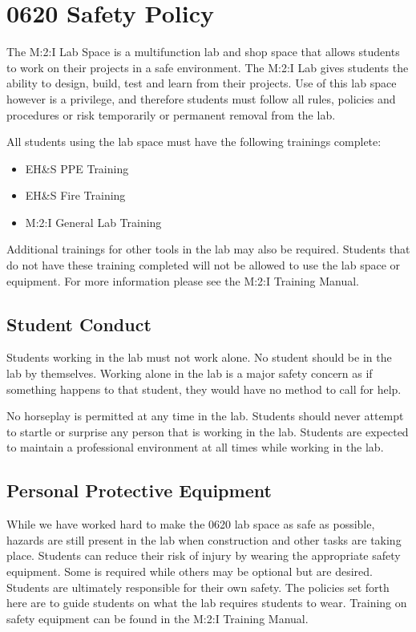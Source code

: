 \chapter{0620 Safety Policy}
The M:2:I Lab Space is a multifunction lab and shop space that allows students to work on their projects in a safe environment.  The M:2:I Lab gives students the ability to design, build, test and learn from their projects.  Use of this lab space however is a privilege, and therefore students must follow all rules, policies and procedures or risk temporarily or permanent removal from the lab.

All students using the lab space must have the following trainings complete:

\begin{itemize}
\item EH\&S PPE Training
\item EH\&S Fire Training
\item M:2:I General Lab Training
\end{itemize}

Additional trainings for other tools in the lab may also be required.  Students that do not have these training completed will not be allowed to use the lab space or equipment.  For more information please see the M:2:I Training Manual.

\section{Student Conduct}
Students working in the lab must not work alone.  No student should be in the lab by themselves.  Working alone in the lab is a major safety concern as if something happens to that student, they would have no method to call for help.  

No horseplay is permitted at any time in the lab.  Students should never attempt to startle or surprise any person that is working in the lab.  Students are expected to maintain a professional environment at all times while working in the lab.

\section{Personal Protective Equipment}
While we have worked hard to make the 0620 lab space as safe as possible, hazards are still present in the lab when construction and other tasks are taking place.  Students can reduce their risk of injury by wearing the appropriate safety equipment.  Some  is required while others may be optional but are desired.  Students are ultimately responsible for their own safety.  The policies set forth here are to guide students on what the lab requires students to wear.  Training on safety equipment can be found in the M:2:I Training Manual.

